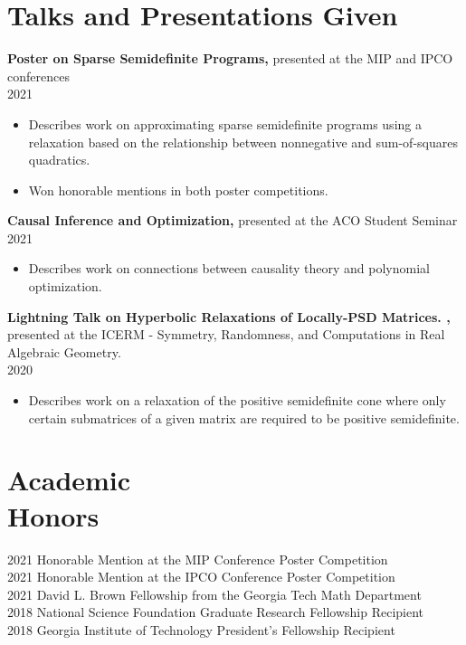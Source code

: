 \documentclass[margin]{res}
\begin{document}
\begin{resume}
\section{Talks and Presentations Given}


{\bf  Poster on Sparse Semidefinite Programs,} presented at the MIP and IPCO conferences \\ 2021 
\begin{itemize} \itemsep -2pt %
\item Describes work on approximating sparse semidefinite programs using a relaxation based on the relationship between nonnegative and sum-of-squares quadratics.
\item Won honorable mentions in both poster competitions.
\end{itemize}

{\bf  Causal Inference and Optimization,} presented at the ACO Student Seminar \\ 2021
\begin{itemize} \itemsep -2pt %
\item Describes work on connections between causality theory and polynomial optimization.
\end{itemize}

{\bf  Lightning Talk on Hyperbolic Relaxations of Locally-PSD Matrices.
,} 
presented at the ICERM - Symmetry, Randomness, and Computations in Real Algebraic Geometry.
 \\ 2020
\begin{itemize} \itemsep -2pt %
\item Describes work on a relaxation of the positive semidefinite cone where only certain submatrices of a given matrix are required to be positive semidefinite.
\end{itemize}


\section{Academic \\ Honors} 
2021 Honorable Mention at the MIP Conference Poster Competition\\
2021 Honorable Mention at the IPCO Conference Poster Competition\\
2021 David L. Brown Fellowship from the Georgia Tech Math Department\\
2018 National Science Foundation Graduate Research Fellowship Recipient\\
2018 Georgia Institute of Technology President's Fellowship Recipient


\end{resume}
\end{document}
